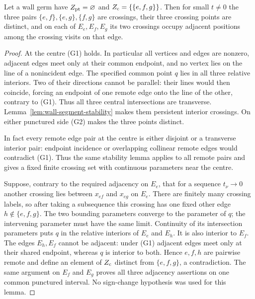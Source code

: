\begin{lemma}\label{lem:triple-sides}
Let a wall germ have $Z_{\rm pt}=\varnothing$ and
$Z_{\rm c}=\{\{e,f,g\}\}$. Then for small $t\neq0$ the three pairs
$\{e,f\},\{e,g\},\{f,g\}$ are crossings, their three crossing points
are distinct, and on each of $E_e,E_f,E_g$ its two crossings occupy adjacent
positions among the crossing visits on that edge.
\end{lemma}
\begin{proof}
At the centre (G1) holds. In particular all vertices and edges are nonzero,
adjacent edges meet only at their common endpoint, and no vertex lies on the
line of a nonincident edge. The specified common point $q$ lies in all three
relative interiors. Two of their directions cannot be parallel: their lines
would then coincide, forcing an endpoint of one remote edge onto the line
of the other, contrary to (G1). Thus all three central intersections are
transverse. Lemma~\ref{lem:wall-segment-stability} makes them persistent
interior crossings. On either punctured side (G2) makes the three points
distinct.

In fact every remote edge pair at the centre is either disjoint or a transverse
interior pair: endpoint incidence or overlapping collinear remote edges would
contradict (G1). Thus the same stability lemma applies to all remote pairs and
gives a fixed finite crossing set with continuous parameters near the centre.

Suppose, contrary to the required adjacency on $E_e$, that for a sequence
$t_\nu\to0$ another crossing lies between $x_{ef}$ and $x_{eg}$ on $E_e$.
There are finitely many crossing labels, so after taking a subsequence this
crossing has one fixed other edge $h\notin\{e,f,g\}$. The two bounding
parameters converge to the parameter of $q$; the intervening parameter must
have the same limit. Continuity of its intersection parameters puts $q$ in
the relative interiors of $E_e$ and $E_h$. It is also interior to $E_f$.
The edges $E_h,E_f$ cannot be adjacent: under (G1) adjacent edges meet only
at their shared endpoint, whereas $q$ is interior to both. Hence $e,f,h$
are pairwise remote and define an element of $Z_{\rm c}$ distinct from
$\{e,f,g\}$, a contradiction. The same argument on $E_f$ and $E_g$ proves
all three adjacency assertions on one common punctured interval. No sign-change
hypothesis was used for this lemma.
\end{proof}



